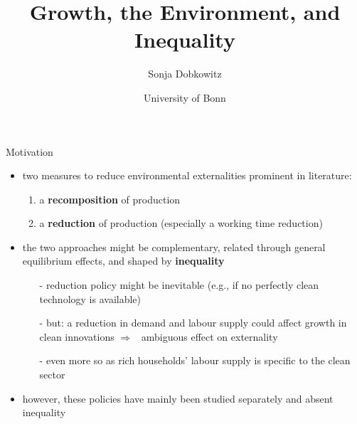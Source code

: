 \documentclass[11pt,aspectratio=169]{beamer}
\author[Sonja Dobkowitz]{\small Sonja Dobkowitz}
\title{Growth, the Environment, and Inequality}
\date{\footnotesize{University of Bonn}}
\institute{December 14, 2021}
\newcommand{\ar}{$\Rightarrow$ \ }
\begin{document}
	
	{
		\begin{frame}
		\titlepage
	\end{frame}
}




\begin{frame}{Motivation}

\begin{itemize}
\item two measures to reduce environmental externalities prominent in literature: 
\begin{enumerate}
\item a \alert{\textbf{recomposition}} of production
\item a \textbf{\alert{reduction}} of production (especially a working time reduction)
\end{enumerate}
\vspace{3mm} 
\item the two approaches might be complementary, related through general equilibrium effects, and shaped by \textbf{\alert{inequality}}
\vspace{3mm}
\begin{itemize}
\item[-] reduction policy might be inevitable (e.g., if no perfectly clean technology is available)
\item[-] but: a reduction in demand and labour supply could affect growth in clean innovations \ar ambiguous effect on externality
\item[-] even more so as rich households' labour supply is specific to the clean sector
\end{itemize}
\vspace{3mm}
\item however,  these policies have mainly been studied separately and absent inequality
\end{itemize}
\end{frame}
%
\end{document}
